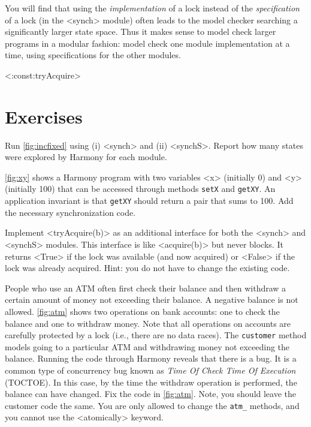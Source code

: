 \documentclass{report}
\begin{document}
You will find that using the \emph{implementation} of a lock instead
of the \emph{specification} of a lock (in the <{synch}> module)
often leads to the model checker searching a
significantly larger state space.
Thus it makes sense to model check larger programs in a modular fashion:
model check one module implementation at a time, using
specifications for the other modules.

<{:const:tryAcquire}>

\section*{Exercises}
\begin{problems}
\item
Run \autoref{fig:incfixed} using (i) <{synch}> and (ii) <{synchS}>.
Report how many states were explored by Harmony for each module.
\item \label{ex:xy} \autoref{fig:xy} shows a Harmony program with two variables <{x}>
(initially 0) and <{y}> (initially 100) that can be accessed through methods
\texttt{setX} and \texttt{getXY}.  An application invariant is that \texttt{getXY}
should return a pair that sums to 100.  Add the necessary synchronization code.
\item \label{ex:trylock} Implement <{tryAcquire(b)}> as an additional
interface for both the <{synch}> and <{synchS}> modules.
This interface is like <{acquire(b)}> but never blocks.  It
returns <{True}> if the lock was available (and now acquired) or <{False}>
if the lock was already acquired.
Hint: you do not have to change the existing code.
\item People who use an ATM often first check their balance and then withdraw
a certain amount of money not exceeding their balance.  A negative balance
is not allowed.  \autoref{fig:atm} shows two operations on bank accounts:
one to check the balance and one to withdraw money.
Note that all operations on accounts are carefully protected by a lock
(i.e., there are no data races).
The \texttt{customer}
method models going to a particular ATM and withdrawing money not exceeding
the balance.
Running the code through Harmony reveals that there is a bug.
It is a common type of concurrency bug known as \emph{Time Of Check Time Of
Execution} (TOCTOE).
In this case, by the time the withdraw operation is performed,
the balance can have changed.
Fix the code in \autoref{fig:atm}.  Note, you should leave the
customer code the same. You are only allowed to change the
\texttt{atm\_} methods, and you cannot use the <{atomically}>
keyword.
\end{problems}
\end{document}
